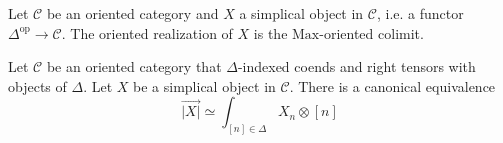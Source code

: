 \documentclass[10pt,oneside]{article}
\numberwithin{equation}{section} %
\numberwithin{figure}{section} %
\theoremstyle{plain}
\theoremstyle{definition}
\newcommand{\mC}{{\mathcal C}}
\newcommand{\op}{\mathrm{op}}
\newcommand{\Max}{\mathrm{Max}}
\newcommand{\ot}{\otimes}
\begin{document}
\begin{definition}

Let $\mC$ be an oriented category and $X $ a simplical object in $\mC$, i.e. a functor $\Delta^\op \to \mC.$
The oriented realization of $X$ is the $\Max$-oriented colimit.
    
\end{definition}

\begin{theorem}\label{realchar} Let $\mC$ be an oriented category that $\Delta$-indexed coends and right tensors with objects of $\Delta$.
Let $X$ be a simplical object in $\mC$.
There is a canonical equivalence
$$ \overset{\to}{| X|} \simeq \int_{[n] \in \Delta} X_n \ot [n]$$

\end{theorem}
\end{document}
